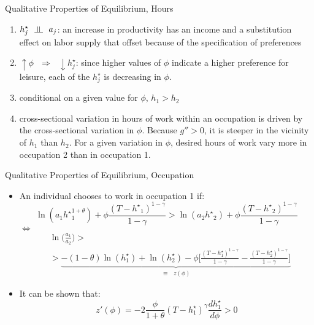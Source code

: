 \documentclass[hyperref={bookmarks=false}]{beamer}
\newcommand{\indep}{\rotatebox[origin=c]{90}{$\models$}}
\begin{document}
\begin{frame}{Qualitative Properties of Equilibrium, Hours}
\begin{enumerate}
\setlength{\itemsep}{0.35 cm}
\item $h_j^{\star}\,\,\,\, \indep\,\,\,\, a_j$: an increase in productivity has an income and a substitution effect on labor supply that offset because of the specification of preferences
\item $\uparrow \phi\,\,\,\, \Rightarrow\,\,\,\, \downarrow h_j^{\star}$: since higher values
of $\phi$ indicate a higher preference for leisure, each of the $h_j^{\star}$ is decreasing in $\phi$.
\item conditional on a given value for $\phi$, $h_1 > h_2$
\item cross-sectional variation in hours of work within an occupation is driven by the cross-sectional variation in $\phi$. Because $g''>0$, it is steeper in the
vicinity of $h_1$ than $h_2$. For a given variation in $\phi$, desired hours of work vary more in occupation 2 than in occupation 1.
\end{enumerate}
\end{frame}

\begin{frame}{Qualitative Properties of Equilibrium, Occupation}
\begin{itemize}
\setlength{\itemsep}{0.35 cm}
\item An individual chooses to work in occupation 1 if:
\begin{equation}
\ln(a_1 {h^{\star}}_{1}^{1+\theta})+\phi\frac{(T-{h^{\star}}_1)^{1-\gamma}}{1-\gamma}>\ln(a_2 {h^{\star}}_2)+\phi\frac{(T-{h^{\star}}_2)^{1-\gamma}}{1-\gamma}
\end{equation} 
$\Leftrightarrow$
\begin{align}
& \ln\Big(\frac{a_1}{a_2}\Big)>  \\ \nonumber
&>\underset{\equiv \,\,\,\, z(\phi)}{\underbrace{-(1-\theta)\ln(h^{\star}_1)+\ln(h^{\star}_2)-\phi\Big[\frac{(T-h^{\star}_1)^{1-\gamma}}{1-\gamma}-\frac{(T-h^{\star}_2)^{1-\gamma}}{1-\gamma}\Big]}}
\end{align} 
\item It can be shown that:
\begin{equation}\label{eq:zet}
z'(\phi)=-2\frac{\phi}{1+\theta}(T-h^{\star}_1)^{\gamma}\frac{d h^{\star}_1}{d \phi} > 0
\end{equation}
\end{itemize}
\end{frame}
\end{document}
